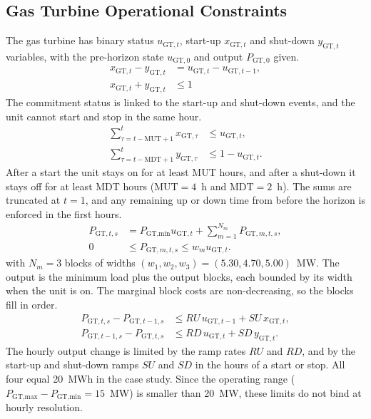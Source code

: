 \documentclass[5p,times,twocolumn]{elsarticle}
\begin{document}
\subsection{Gas Turbine Operational Constraints}
The gas turbine has binary status $u_{\text{GT},t}$, start-up $x_{\text{GT},t}$ and
shut-down $y_{\text{GT},t}$ variables, with the pre-horizon state
$u_{\text{GT},0}$ and output $P_{\text{GT},0}$ given.
\begin{equation}
\begin{aligned}
x_{\text{GT},t} - y_{\text{GT},t}
&= u_{\text{GT},t} - u_{\text{GT},t-1}, \\
x_{\text{GT},t} + y_{\text{GT},t}
&\le 1
\end{aligned}
\label{eq:gt_status}
\end{equation}
The commitment status is linked to the start-up and shut-down events, and the unit
cannot start and stop in the same hour.
\begin{align}
\sum_{\tau = t - \text{MUT} + 1}^t x_{\text{GT},\tau} &\le u_{\text{GT},t},
\label{eq:gt_minup}\\
\sum_{\tau = t - \text{MDT} + 1}^t y_{\text{GT},\tau} &\le 1 - u_{\text{GT},t}.
\label{eq:gt_mindown}
\end{align}
After a start the unit stays on for at least MUT hours, and after a shut-down it
stays off for at least MDT hours ($\text{MUT}=4$~h and $\text{MDT}=2$~h). The sums
are truncated at $t=1$, and any remaining up or down time from before the horizon
is enforced in the first hours.
\begin{equation}
\begin{aligned}
P_{\text{GT},t,s} &= P_{\text{GT,min}} u_{\text{GT},t} + \sum_{m=1}^{N_m} P_{\text{GT},m,t,s},\\
0 &\leq P_{\text{GT},m,t,s} \leq w_m u_{\text{GT},t}.
\end{aligned}
\label{eq:gt_output}
\end{equation}
with $N_m=3$ blocks of widths $(w_1,w_2,w_3)=(5.30,4.70,5.00)$~MW. The output is the
minimum load plus the output blocks, each bounded by its width when the unit is
on. The marginal block costs are non-decreasing, so the blocks fill in order.
\begin{align}
P_{\text{GT},t,s} - P_{\text{GT},t-1,s} &\le RU\,u_{\text{GT},t-1} + SU\,x_{\text{GT},t},
\label{eq:gt_rampup}\\
P_{\text{GT},t-1,s} - P_{\text{GT},t,s} &\le RD\,u_{\text{GT},t} + SD\,y_{\text{GT},t}.
\label{eq:gt_rampdown}
\end{align}
The hourly output change is limited by the ramp rates $RU$ and $RD$, and by the
start-up and shut-down ramps $SU$ and $SD$ in the hours of a start or stop. All four
equal 20~MWh in the case study. Since the operating range
($P_{\text{GT,max}}-P_{\text{GT,min}}=15$~MW) is smaller than 20~MW, these limits do
not bind at hourly resolution. 
\end{document}
